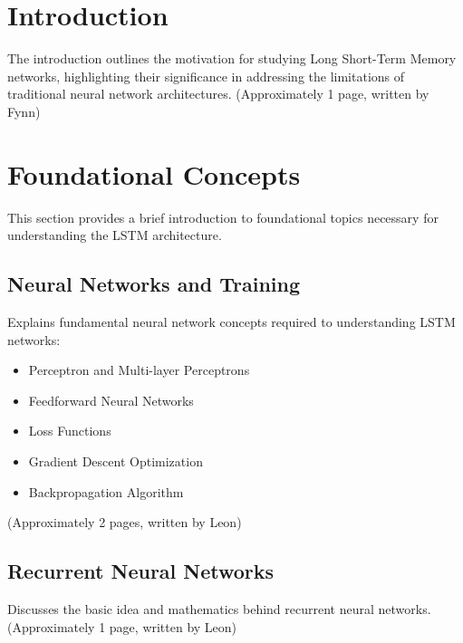 \documentclass[twoside,a4paper,10pt,DIV=12,BCOR=12mm]{scrartcl}
\begin{document}


\begin{abstract}
\end{abstract}

\tableofcontents
\newpage


\section{Introduction}

The introduction outlines the motivation for studying Long Short-Term Memory networks,
highlighting their significance in addressing the limitations of traditional neural network
architectures.
(Approximately 1 page, written by Fynn)

\section{Foundational Concepts}

This section provides a brief introduction to foundational topics necessary
for understanding the LSTM architecture.

\subsection{Neural Networks and Training}

Explains fundamental neural network concepts required to understanding LSTM networks:

\begin{itemize}
\item Perceptron and Multi-layer Perceptrons
\item Feedforward Neural Networks
\item Loss Functions
\item Gradient Descent Optimization
\item Backpropagation Algorithm
\end{itemize}
(Approximately 2 pages, written by Leon)

\subsection{Recurrent Neural Networks}

Discusses the basic idea and mathematics behind recurrent neural networks.
(Approximately 1 page, written by Leon)
\end{document}
